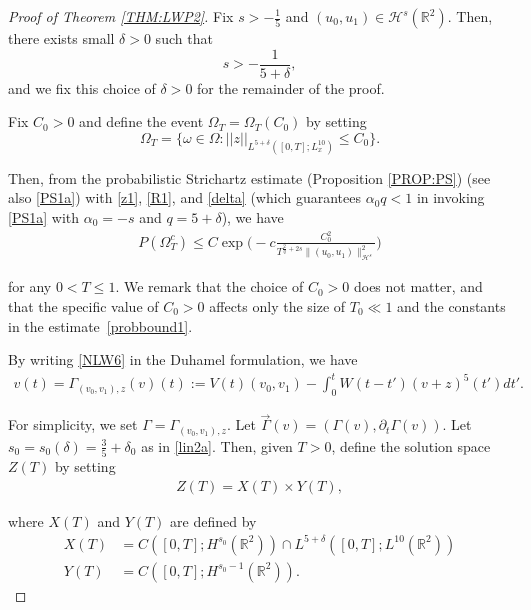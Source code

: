 \documentclass[letterpaper, 11pt,  reqno]{amsart}
\newcommand{\1}{\hspace{0.5mm}\text{I}\hspace{0.2mm}}
\newcommand{\noi}{\noindent}
\newcommand{\R}{\mathbb{R}}
\newcommand{\al}{\alpha}
\newcommand{\dl}{\delta}
\newcommand{\G}{\Gamma}
\newcommand{\dt}{\partial_t}
\renewcommand{\o}{\omega}
\renewcommand{\O}{\Omega}
\renewcommand{\H}{\mathcal{H}}
\numberwithin{equation}{section}
\numberwithin{theorem}{section}
\begin{document}
\begin{proof}[Proof of Theorem \ref{THM:LWP2}]
Fix  $s > -\frac{1}{5}$ and $(u_0, u_1) \in \H^s(\R^2)$.
Then, there exists small $\dl > 0$ such that 
\begin{equation}\label{delta}
s > -\frac{1}{5 + \delta}, 
\end{equation}
and we fix this choice of $\delta > 0$ for the remainder of the proof. 

Fix $C_0 > 0$ and 
define  the event $\O_T = \O_T(C_0)$ by setting 
\begin{equation}
\O_{T} = \big\{ \o \in \O: ||z||_{L^{5+\delta}([0, T]; L^{10}_{x})} \le
C_0 
 \big\}.
 \label{O1}
\end{equation}


\noi
Then, from 
 the probabilistic Strichartz estimate (Proposition \ref{PROP:PS})
 (see also \eqref{PS1a})
 with \eqref{z1}, \eqref{R1}, and  
 \eqref{delta}
  (which guarantees $\al_0 q < 1$ in invoking \eqref{PS1a} with $\al_0 = -s$ and $q = 5+\dl$),  
  we have 
\begin{align}
P(\O_T^c) 
\leq C\exp\Bigg(-c\frac{C_0^2 }{T^{\frac 2 q +2s } \|   (u_0, u_1)  \|_{\H^s}^{2}}\Bigg)
\label{PS1x}
\end{align}
	
\noi
for any $0 < T \le 1$.
 We remark that the choice of $C_0 > 0$ does not matter, 
 and that the specific value of $C_0 > 0$ affects only the size of $T_{0} \ll 1$ and the constants in the estimate~\eqref{probbound1}.




By writing \eqref{NLW6} in the Duhamel formulation, we have
\begin{align*}
v(t) = \G_{(v_0, v_1), z} (v)(t) := V(t) (v_0, v_1) - \int_0^t W(t - t') (v+z)^5(t') dt'.
\end{align*}


\noi
For simplicity, we set $\G =  \G_{(v_0, v_1), z} $. Let $\vec \G(v) = (\G(v), \dt \G(v))$.
Let $s_0 = s_0(\dl) = \frac 35+\dl_0$ as in \eqref{lin2a}.
Then, given $T > 0$, 
define the solution space $Z(T)$ by setting
\begin{align*}
Z(T) = X(T) \times Y(T), 
\end{align*}

\noi
where $X(T)$ and $Y(T)$ are defined by 
\begin{align*}
X(T) &  = C([0, T]; H^{s_0}(\R^2))\cap 
L^{5+\dl}([0, T];  L^{10}(\R^2))\\
Y(T) & =  C([0, T]; H^{s_0-1}(\R^2)).
\end{align*}



\end{proof}
\end{document}
